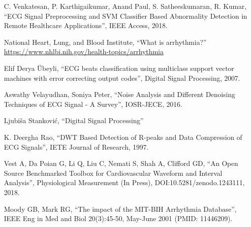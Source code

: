 \documentclass[12pt]{SeminarskiADS}
\begin{document}


\clearpage
\begin{thebibliography}{99}
 C. Venkatesan, P. Karthigaikumar, Anand Paul, S. Satheeskumaran, R. Kumar, ``ECG Signal Preprocessing and SVM Classifier Based Abnormality Detection in Remote Healthcare Applications'', IEEE Access, 2018.

 National Heart, Lung, and Blood Institute, ``What is arrhythmia?''
\url{https://www.nhlbi.nih.gov/health-topics/arrhythmia}

 Elif Derya Übeyli, ``ECG beats classification using multiclass support vector machines with error correcting output codes'', Digital Signal Processing, 2007.

 Aswathy Velayudhan, Soniya Peter, ``Noise Analysis and Different Denoising Techniques of ECG Signal - A Survey'', IOSR-JECE, 2016.

 Ljubiša Stanković, ``Digital Signal Processing''

 K. Deergha Rao, ``DWT Based Detection of R-peaks and Data Compression of ECG Signals'', IETE Journal of Research, 1997.

 Vest A, Da Poian G, Li Q, Liu C, Nemati S, Shah A, Clifford GD, ``An Open Source Benchmarked Toolbox for Cardiovascular Waveform and Interval Analysis'', Physiological Measurement (In Press), DOI:10.5281/zenodo.1243111, 2018.

 Moody GB, Mark RG, ``The impact of the MIT-BIH Arrhythmia Database'', IEEE Eng in Med and Biol 20(3):45-50, May-June 2001 (PMID: 11446209). 


\end{thebibliography}
\end{document}

